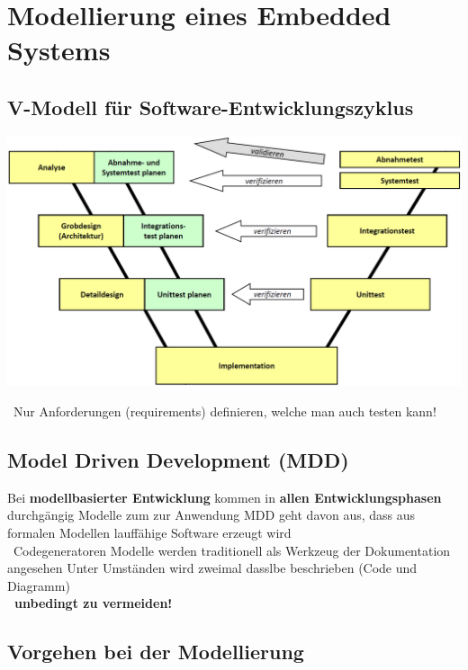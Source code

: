 \section{Modellierung eines Embedded Systems}

\subsection{V-Modell für Software-Entwicklungszyklus}

\begin{center}
    \includegraphics[width=0.8\columnwidth]{images/V_modell.png}
\end{center}

\textrightarrow\ Nur Anforderungen (requirements) definieren, welche man auch testen kann!


\subsection{Model Driven Development (MDD)}

\begin{outline}
    \1 Bei \textbf{modellbasierter Entwicklung} kommen in \textbf{allen Entwicklungsphasen} durchgängig Modelle zum zur Anwendung
    \1 MDD geht davon aus, dass aus formalen Modellen lauffähige Software erzeugt wird \\
        \textrightarrow\ Codegeneratoren
    \1 Modelle werden traditionell als Werkzeug der Dokumentation angesehen
        \2 Unter Umständen wird zweimal dasslbe beschrieben (Code und Diagramm) \\
            \textbf{\textrightarrow\ unbedingt zu vermeiden!}
\end{outline}


\subsection{Vorgehen bei der Modellierung}

